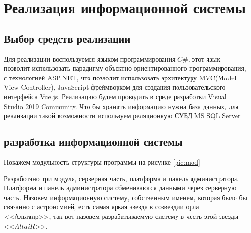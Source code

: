 \section{Реализация информационной системы}
\subsection{Выбор средств реализации}

Для реализации воспользуемся языком программирования $C\#$, этот язык позволит использовать парадигму объектно-ориентированного программирования, с технологией ASP.NET, что позволит использовать архитектуру MVC(Model View Controller), JavaScript-фреймворком для создания пользовательского интерфейса Vue.js. Реализацию будем проводить в среде разработки Visual Studio 2019 Community. Что бы хранить информацию нужна база данных, для реализации такой возможности используем реляционную СУБД MS SQL Server

\subsection{разработка информационной системы}

Покажем модульность структуры программы на рисунке \ref{pic:mod}



Разработано три модуля, серверная часть, платформа и панель администратора. Платформа и панель администратора обмениваются данными через серверную часть. Назовем информационную систему, собственным именем, которая было бы связанно с астрономией, есть самая яркая звезда в созвездии орла <<Альтаир>>, так вот назовем разрабатываемую систему в честь этой звезды <<$AltaiR$>>.
\pagebreak